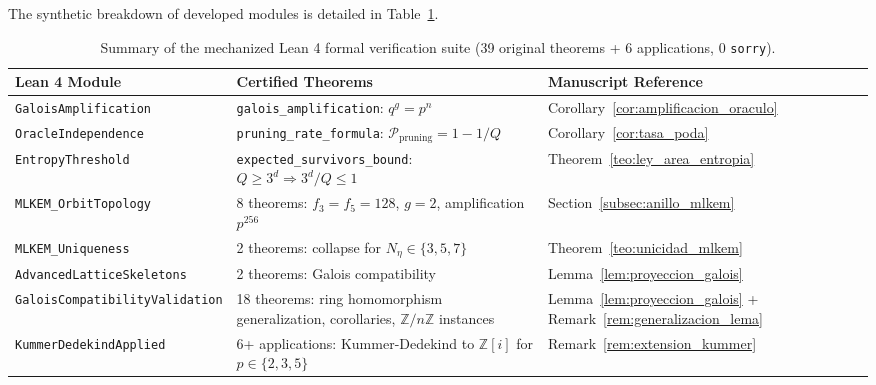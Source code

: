\documentclass[11pt,a4paper]{article}
\theoremstyle{plain}
\theoremstyle{definition}
\numberwithin{equation}{section}
\newcommand{\ZZ}{\mathbb{Z}}
\begin{document}
The synthetic breakdown of developed modules is detailed in Table~\ref{tab:lean4_suite}.

\begin{table}[htbp]
\centering
\caption{Summary of the mechanized Lean 4 formal verification suite (39 original theorems + 6 applications, 0 \texttt{sorry}).}
\label{tab:lean4_suite}
\small
\begin{tabular}{l p{4.3cm} p{4.5cm}}
\toprule
\textbf{Lean 4 Module} & \textbf{Certified Theorems} & \textbf{Manuscript Reference} \\
\midrule
\texttt{GaloisAmplification} & \texttt{galois\_amplification}: $q^g = p^n$ & Corollary~\ref{cor:amplificacion_oraculo} \\
\texttt{OracleIndependence} & \texttt{pruning\_rate\_formula}: $\mathcal{P}_{\text{pruning}} = 1 - 1/Q$ & Corollary~\ref{cor:tasa_poda} \\
\texttt{EntropyThreshold} & \texttt{expected\_survivors\_bound}: $Q \ge 3^d \Rightarrow 3^d/Q \le 1$ & Theorem~\ref{teo:ley_area_entropia} \\
\texttt{MLKEM\_OrbitTopology} & 8 theorems: $f_3 = f_5 = 128$, $g = 2$, amplification $p^{256}$ & Section~\ref{subsec:anillo_mlkem} \\
\texttt{MLKEM\_Uniqueness} & 2 theorems: collapse for $N_\eta \in \{3, 5, 7\}$ & Theorem~\ref{teo:unicidad_mlkem} \\
\texttt{AdvancedLatticeSkeletons} & 2 theorems: Galois compatibility & Lemma~\ref{lem:proyeccion_galois} \\
\hline
\texttt{GaloisCompatibilityValidation} & 18 theorems: ring homomorphism generalization, corollaries, $\ZZ/n\ZZ$ instances & Lemma~\ref{lem:proyeccion_galois} + Remark~\ref{rem:generalizacion_lema} \\
\hline
\texttt{KummerDedekindApplied} & 6+ applications: Kummer-Dedekind to $\ZZ[i]$ for $p \in \{2, 3, 5\}$ & Remark~\ref{rem:extension_kummer} \\
\bottomrule
\end{tabular}
\end{table}
\end{document}
